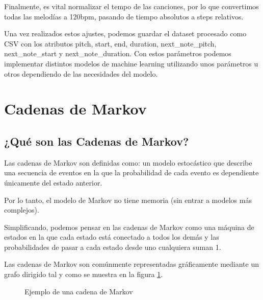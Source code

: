 Finalmente, es vital normalizar el tempo de las canciones, por lo que convertimos todas las melodías a 120bpm, pasando de tiempo absolutos a steps relativos.

Una vez realizados estos ajustes, podemos guardar el dataset procesado como CSV con los atributos pitch, start, end, duration, next\_note\_pitch, next\_note\_start y next\_note\_duration. Con estos parámetros podemos implementar distintos modelos de machine learning utilizando unos parámetros u otros dependiendo de las necesidades del modelo.

\section{Cadenas de Markov}
\label{sec:markov-chain}

    \subsection{¿Qué son las Cadenas de Markov?}
    \label{subsec:definicionCadenasMarkov}
    Las cadenas de Markov son definidas como: un modelo estocástico que describe una secuencia de eventos en la que la probabilidad de cada evento es dependiente únicamente del estado anterior.

    Por lo tanto, el modelo de Markov no tiene memoria (sin entrar a modelos más complejos).

    Simplificando, podemos pensar en las cadenas de Markov como una máquina de estados en la que cada estado está conectado a todos los demás y las probabilidades de pasar a cada estado desde uno cualquiera suman 1.

    Las cadenas de Markov son comúnmente representadas gráficamente mediante un grafo dirigido tal y como se muestra en la figura \ref{fig:sampleChain1}.

    \begin{figure}
    \centering
    \caption{Ejemplo de una cadena de Markov} 
    \label{fig:sampleChain1}
    \end{figure}
    
